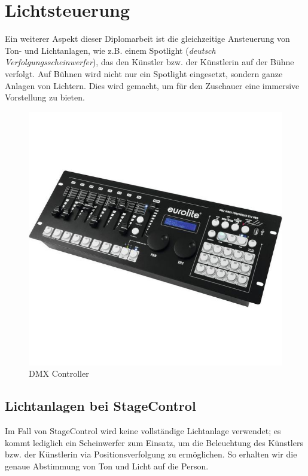 \section{Lichtsteuerung}
Ein weiterer Aspekt dieser Diplomarbeit ist die gleichzeitige Ansteuerung von Ton- und Lichtanlagen, wie z.B. einem Spotlight (\emph{deutsch Verfolgungsscheinwerfer}), das den Künstler bzw. der Künstlerin auf der Bühne verfolgt. Auf Bühnen wird nicht nur ein Spotlight eingesetzt, sondern ganze Anlagen von Lichtern. Dies wird gemacht, um für den Zuschauer eine immersive Vorstellung zu bieten. 

\begin{figure}[H]
	\centering
	\includegraphics[width=0.7\linewidth]{images/DMX_Controller.jpg}
	\caption[DMX Controller]{DMX Controller}
	\label{fig:DMX_Controller}
\end{figure}

\subsection{Lichtanlagen bei StageControl}
Im Fall von StageControl wird keine vollständige Lichtanlage verwendet; es kommt lediglich ein Scheinwerfer zum Einsatz, um die Beleuchtung des Künstlers bzw. der Künstlerin via Positionsverfolgung zu ermöglichen. So erhalten wir die genaue Abstimmung von Ton und Licht auf die Person.

